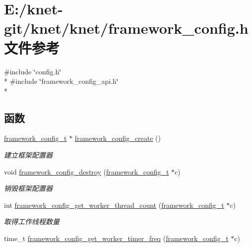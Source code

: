 \hypertarget{a00056}{}\section{E\+:/knet-\/git/knet/knet/framework\+\_\+config.h 文件参考}
\label{a00056}
{\ttfamily \#include \char`\"{}config.\+h\char`\"{}}\\*
{\ttfamily \#include \char`\"{}framework\+\_\+config\+\_\+api.\+h\char`\"{}}\\*
\subsection*{函数}
\begin{DoxyCompactItemize}
\item 
\hyperlink{a00051_a55b26efa9e6ee05514d087ba2593a54b_a55b26efa9e6ee05514d087ba2593a54b}{framework\+\_\+config\+\_\+t} $\ast$ \hyperlink{a00056_a86930a2422f44672a2ddde80fb6a5b5a_a86930a2422f44672a2ddde80fb6a5b5a}{framework\+\_\+config\+\_\+create} ()
\begin{DoxyCompactList}\small\item\em 建立框架配置器 \end{DoxyCompactList}\item 
void \hyperlink{a00056_a4a798f64988a0fe651e2f247acae55b2_a4a798f64988a0fe651e2f247acae55b2}{framework\+\_\+config\+\_\+destroy} (\hyperlink{a00051_a55b26efa9e6ee05514d087ba2593a54b_a55b26efa9e6ee05514d087ba2593a54b}{framework\+\_\+config\+\_\+t} $\ast$c)
\begin{DoxyCompactList}\small\item\em 销毁框架配置器 \end{DoxyCompactList}\item 
int \hyperlink{a00056_aca3f6b57e6c3e601ddf2ecd8d536aa32_aca3f6b57e6c3e601ddf2ecd8d536aa32}{framework\+\_\+config\+\_\+get\+\_\+worker\+\_\+thread\+\_\+count} (\hyperlink{a00051_a55b26efa9e6ee05514d087ba2593a54b_a55b26efa9e6ee05514d087ba2593a54b}{framework\+\_\+config\+\_\+t} $\ast$c)
\begin{DoxyCompactList}\small\item\em 取得工作线程数量 \end{DoxyCompactList}\item 
time\+\_\+t \hyperlink{a00056_a51dc2e8f2c74f8c4418400e867bf18ad_a51dc2e8f2c74f8c4418400e867bf18ad}{framework\+\_\+config\+\_\+get\+\_\+worker\+\_\+timer\+\_\+freq} (\hyperlink{a00051_a55b26efa9e6ee05514d087ba2593a54b_a55b26efa9e6ee05514d087ba2593a54b}{framework\+\_\+config\+\_\+t} $\ast$c)

\end{DoxyCompactItemize}
